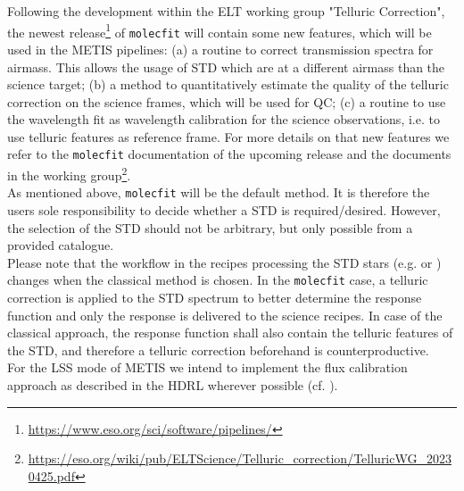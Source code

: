 Following the development within the \ac{ELT} working group "Telluric Correction", the newest release\footnote{\url{https://www.eso.org/sci/software/pipelines/}} of \texttt{molecfit} will contain some new features, which will be used in the \ac{METIS} pipelines: (a) a routine to correct transmission spectra for airmass. This allows the usage of \ac{STD} which are at a different airmass than the science target; (b) a method to quantitatively estimate the quality of the telluric correction on the science frames, which will be used for \ac{QC}; (c) a routine to use the wavelength fit as wavelength calibration for the science observations, i.e. to use telluric features as reference frame. For more details on that new features we refer to the \texttt{molecfit} documentation of the upcoming release and the documents in the working group\footnote{\url{https://eso.org/wiki/pub/ELTScience/Telluric_correction/TelluricWG_20230425.pdf}}.\\
As mentioned above, \texttt{molecfit} will be the default method. It is therefore the users sole responsibility to decide whether a \ac{STD} is required/desired. However, the selection of the \ac{STD} should not be arbitrary, but only possible from a provided catalogue.\\
Please note that the workflow in the recipes processing the \ac{STD} stars (e.g. \hyperref[rec:metis_lm_lss_std]{} or \hyperref[rec:metis_n_lss_std]{}) changes when the classical method is chosen. In the \texttt{molecfit} case, a telluric correction is applied to the \ac{STD} spectrum to better determine the response function and only the response is delivered to the science recipes. In case of the classical approach, the response function shall also contain the telluric features of the \ac{STD}, and therefore a telluric correction beforehand is counterproductive.\\
For the \ac{LSS} mode of \ac{METIS} we intend to implement the flux calibration approach as described in the \ac{HDRL} wherever possible (cf. \cite{hdrl-manual}). %


